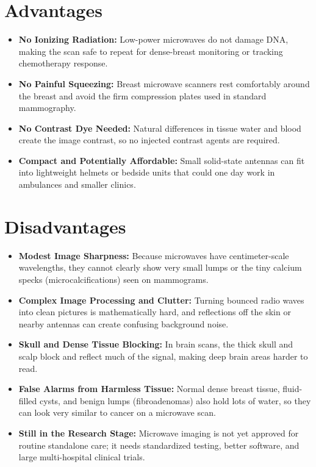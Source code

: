 \section{Advantages}
\begin{itemize}
  \item \textbf{No Ionizing Radiation:} Low-power microwaves do not damage DNA, making the scan safe to repeat for dense-breast monitoring or tracking chemotherapy response.
  \item \textbf{No Painful Squeezing:} Breast microwave scanners rest comfortably around the breast and avoid the firm compression plates used in standard mammography.
  \item \textbf{No Contrast Dye Needed:} Natural differences in tissue water and blood create the image contrast, so no injected contrast agents are required.
  \item \textbf{Compact and Potentially Affordable:} Small solid-state antennas can fit into lightweight helmets or bedside units that could one day work in ambulances and smaller clinics.
\end{itemize}

\section{Disadvantages}
\begin{itemize}
  \item \textbf{Modest Image Sharpness:} Because microwaves have centimeter-scale wavelengths, they cannot clearly show very small lumps or the tiny calcium specks (microcalcifications) seen on mammograms.
  \item \textbf{Complex Image Processing and Clutter:} Turning bounced radio waves into clean pictures is mathematically hard, and reflections off the skin or nearby antennas can create confusing background noise.
  \item \textbf{Skull and Dense Tissue Blocking:} In brain scans, the thick skull and scalp block and reflect much of the signal, making deep brain areas harder to read.
  \item \textbf{False Alarms from Harmless Tissue:} Normal dense breast tissue, fluid-filled cysts, and benign lumps (fibroadenomas) also hold lots of water, so they can look very similar to cancer on a microwave scan.
  \item \textbf{Still in the Research Stage:} Microwave imaging is not yet approved for routine standalone care; it needs standardized testing, better software, and large multi-hospital clinical trials.
\end{itemize}

